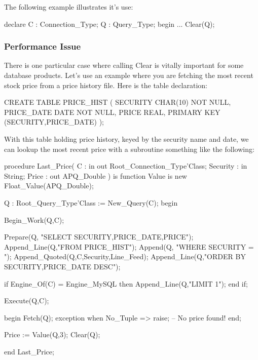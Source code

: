 \documentclass[english,letterpaper]{book}
\begin{document}
The following example illustrates it's use:

\begin{Example}
declare
   C : Connection_Type;
   Q : Query_Type;
begin
   ...
   Clear(Q);
\end{Example}

\subsubsection{Performance Issue}

There is one particular case where calling Clear is vitally important
for some database products. Let's use an example where you are fetching
the most recent stock price from a price history file. Here is the
table declaration:

\begin{SQL}
CREATE TABLE PRICE_HIST (
   SECURITY    CHAR(10) NOT NULL,
   PRICE_DATE  DATE NOT NULL,
   PRICE       REAL,
   PRIMARY KEY (SECURITY,PRICE_DATE)
);
\end{SQL}

With this table holding price history, keyed by the security name
and date, we can lookup the most recent price with a subroutine something
like the following:

\begin{NumberedExample}
procedure Last_Price(
   C :        in out Root_Connection_Type'Class;
   Security : in     String;
   Price :       out APQ_Double
) is
   function Value is new Float_Value(APQ_Double);

   Q : Root_Query_Type'Class := New_Query(C);\label{Ex:TheQ}
begin

   Begin_Work(Q,C);

   Prepare(Q,    "SELECT SECURITY,PRICE_DATE,PRICE");
   Append_Line(Q,"FROM PRICE_HIST");
   Append(Q,     "WHERE SECURITY = ");
   Append_Quoted(Q,C,Security,Line_Feed);
   Append_Line(Q,"ORDER BY SECURITY,PRICE_DATE DESC");\label{Ex:OrderBy}

   if Engine_Of(C) = Engine_MySQL then
      Append_Line(Q,"LIMIT 1");\label{Ex:Limit1}
   end if;

   Execute(Q,C);

   begin
      Fetch(Q);
   exception
      when No_Tuple =>
         raise;   -- No price found!
   end;

   Price := Value(Q,3);
   Clear(Q);\label{Ex:Clear}

end Last_Price;
\end{NumberedExample}
\end{document}
